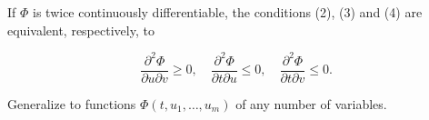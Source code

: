 If \(\Phi\) is twice continuously differentiable, the conditions (2), (3) and (4) are equivalent, respectively, to

\[
\frac {\partial^ {2} \Phi}{\partial u \partial v} \geqslant 0, \quad \frac {\partial^ {2} \Phi}{\partial t \partial u} \leqslant 0, \quad \frac {\partial^ {2} \Phi}{\partial t \partial v} \leqslant 0.
\]

Generalize to functions \(\Phi(t, u_1, \ldots, u_m)\) of any number of variables.

\setcounter{exercisegroup}{6}
\edef\CurrentExerciseGroup{\arabic{exercisegroup}}
